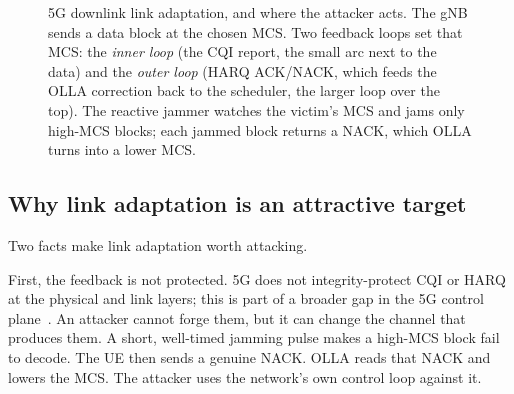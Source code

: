\documentclass[conference]{IEEEtran}
\begin{document}
\begin{figure}[t]\centering
{}
\caption{5G downlink link adaptation, and where the attacker acts. The gNB sends a data
block at the chosen MCS. Two feedback loops set that MCS: the \emph{inner loop} (the CQI
report, the small arc next to the data) and the \emph{outer loop} (HARQ ACK/NACK, which
feeds the OLLA correction back to the scheduler, the larger loop over the top). The
reactive jammer watches the victim's MCS and jams only high-MCS blocks; each jammed block
returns a NACK, which OLLA turns into a lower MCS.}
\label{fig:loop}\end{figure}

\subsection{Why link adaptation is an attractive target}
Two facts make link adaptation worth attacking.

First, the feedback is not protected. 5G does not integrity-protect CQI or HARQ at the
physical and link layers; this is part of a broader gap in the 5G control
plane~\cite{jover2019security}. An attacker cannot forge them, but it can change the channel
that produces them. A short, well-timed jamming pulse makes a high-MCS block fail to
decode. The UE then sends a genuine NACK. OLLA reads that NACK and lowers the MCS. The
attacker uses the network's own control loop against it.
\end{document}
